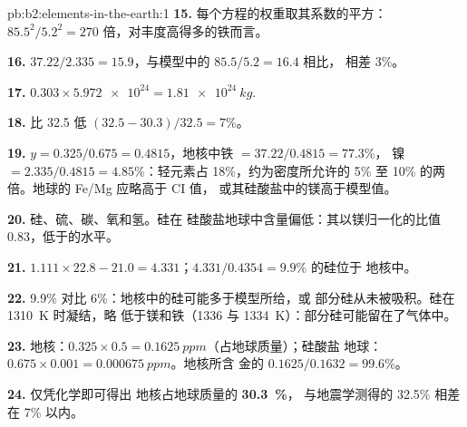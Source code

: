 \begin{solution}{pb:b2:elements-in-the-earth:1}
\textbf{15.} 每个方程的权重取其系数的平方：$85.5^2/5.2^2 = 270$
倍，对丰度高得多的铁而言。

\textbf{16.} $37.22/2.335 = 15.9$，与模型中的 $85.5/5.2 = 16.4$ 相比，
相差 3\%。

\textbf{17.} $0.303\times\num{5.972e24} = \qty{1.81e24}{kg}$.

\textbf{18.} 比 32.5 低 $(32.5-30.3)/32.5 = 7$\%。

\textbf{19.} $y = 0.325/0.675 = 0.4815$，地核中铁 $= 37.22/0.4815 = 77.3$\%，
镍 $= 2.335/0.4815 = 4.85$\%：轻元素占 18\%，约为密度所允许的 5\% 至
10\% 的两倍。地球的 Fe/Mg 应略高于 CI 值，
或其硅酸盐中的镁高于模型值。

\textbf{20.} 硅、硫、碳、氧和氢。硅在
硅酸盐地球中含量偏低：其以镁归一化的比值 0.83，低于的水平。

\textbf{21.} $1.111\times22.8 - 21.0 = 4.331$；$4.331/0.4354 = 9.9$\% 的硅位于
地核中。

\textbf{22.} 9.9\% 对比 6\%：地核中的硅可能多于模型所给，或
部分硅从未被吸积。硅在 \qty{1310}{K} 时凝结，略
低于镁和铁（1336 与 \qty{1334}{K}）：部分硅可能留在了气体中。

\textbf{23.} 地核：$0.325\times0.5 = \qty{0.1625}{ppm}$（占地球质量）；硅酸盐
地球：$0.675\times0.001 = \qty{0.000675}{ppm}$。地核所含
金的 $0.1625/0.1632 = 99.6$\%。

\textbf{24.} 仅凭化学即可得出
地核占地球质量的 \textbf{\qty[text-series-to-math=true]{30.3}{\percent}}，
与地震学测得的 32.5\% 相差在 7\% 以内。
\end{solution}
